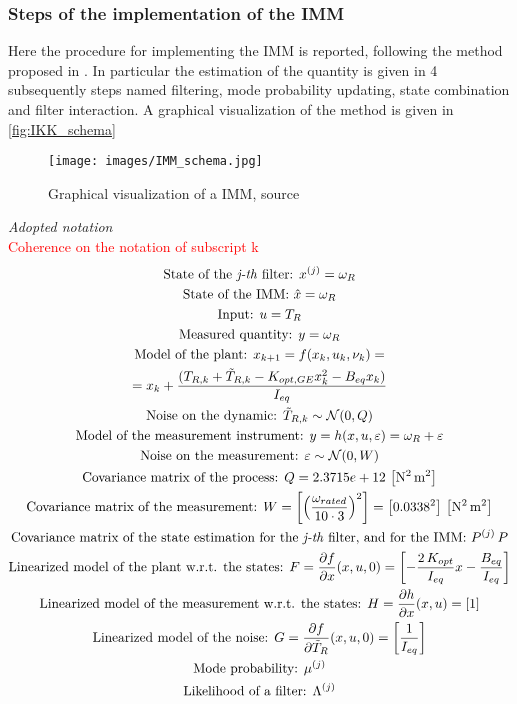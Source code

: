 \subsubsection{Steps of the implementation of the IMM}
Here the procedure for implementing the IMM is reported, following the method proposed in \cite{kalman_based_IMM}. In particular the estimation of the quantity is given in 4 subsequently steps named filtering, mode probability updating, state combination and filter interaction. A graphical visualization of the method is given in \autoref{fig:IKK_schema}
\begin{figure}[H]
  \centering
  \texttt{[image: images/IMM\_schema.jpg]}
  \caption{Graphical visualization of a IMM, source \cite{kalman_based_IMM}}
  \label{fig:IKK_schema}
\end{figure}

\textit{Adopted notation}\\
\textcolor{red}{Coherence on the notation of subscript k}
\begin{multline}
  \text{State of the \textit{j-th} filter: } x^{(j)} = \omega_{R} \\
  \text{State of the IMM: } \hat{x} = \omega_R\\
  \text{Input: } u = T_{R}\\
  \text{Measured quantity: } y = \omega_{R} \\
  \text{Model of the plant: }  x_{k+1} = f(x_k, u_k, \nu_k) = \\ \notag
  = x_k + \frac{(T_{R,k} + \tilde{T}_{R,k} - K_{opt,GE}x_k^2 - B_{eq}x_k)}{I_{eq}}\\
  \text{Noise on the dynamic: } \tilde{T}_{R,k} \sim \mathcal{N}(0, Q) \\ \label{eq:noise_Q}
  \text{Model of the measurement instrument: } y = h(x, u, \varepsilon) = \omega_{R} + \varepsilon \\
  \text{Noise on the measurement: } \varepsilon \sim \mathcal{N}(0, W)  \\
  \text{Covariance matrix of the process: } Q = 2.3715e+12 \, \left[\si{\square\newton\square \meter}\right]\\
  \text{Covariance matrix of the measurement: } W = \left[\left(\frac{\omega_{rated}}{10 \cdot3}\right)^2\right] = \left[0.0338^2\right] \, \left[\si{\square\newton\square \meter}\right]\\
  \text{Covariance matrix of the state estimation for the \textit{j-th} filter, and for the IMM: } P^{(j)} \, P\\
  \text{Linearized model of the plant w.r.t. the states: } F = \frac{\partial f}{\partial x}(x, u, 0) = \left[-\frac{2\,K_{opt}}{I_{eq}}x - \frac{B_{eq}}{I_{eq}}\right]\\
  \text{Linearized model of the measurement w.r.t. the states: } H = \frac{\partial h}{\partial x}(x, u) = \left[1\right]\\
  \text{Linearized model of the noise: } G = \frac{\partial f}{\partial \tilde{T}_R}(x, u, 0)=\left[\frac{1}{I_{eq}}\right]\\
  \text{Mode probability: } \mu^{(j)}\\
  \text{Likelihood of a filter: } \Lambda^{(j)}
\end{multline}

